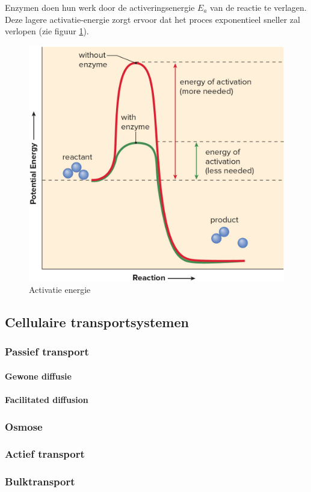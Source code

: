 \documentclass[a4paper,kul]{kulakarticle} %
\begin{document}
Enzymen doen hun werk door de activeringsenergie $E_a$ van de reactie te verlagen. Deze lagere activatie-energie zorgt ervoor dat het proces exponentieel sneller zal verlopen (zie figuur \ref{fig:activatieenergie}). 
\begin{figure}[h]
	\centering
	\includegraphics[width=0.7\linewidth]{ActivatieEnergie}
	\caption[Activatie energie]{Activatie energie}
	\label{fig:activatieenergie}
\end{figure}



\subsection{Cellulaire transportsystemen}
\subsubsection{Passief transport}
\paragraph{Gewone diffusie}
\paragraph{Facilitated diffusion}
\subsubsection{Osmose}
\subsubsection{Actief transport}
\subsubsection{Bulktransport}
\newpage
\end{document}
